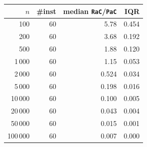 \begin{tabular}{@{}rrrr@{}}
\toprule
$n$ & \#inst & median \texttt{RaC}/\texttt{PaC} & IQR \\
\midrule
100 & 60 & 5.78 & 0.454 \\
200 & 60 & 3.68 & 0.192 \\
500 & 60 & 1.88 & 0.120 \\
1\,000 & 60 & 1.15 & 0.053 \\
2\,000 & 60 & 0.524 & 0.034 \\
5\,000 & 60 & 0.198 & 0.016 \\
10\,000 & 60 & 0.100 & 0.005 \\
20\,000 & 60 & 0.043 & 0.004 \\
50\,000 & 60 & 0.015 & 0.001 \\
100\,000 & 60 & 0.007 & 0.000 \\
\bottomrule
\end{tabular}
